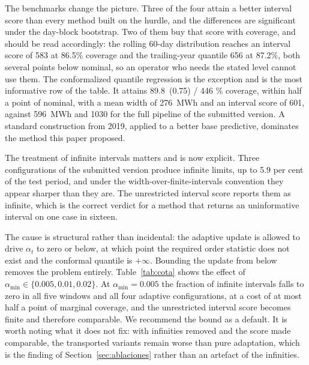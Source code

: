 \documentclass[preprint,3p,times]{elsarticle}
\providecommand{\DIFaddtex}[1]{{\protect\color{blue} \sf #1}} %
\providecommand{\DIFdeltex}[1]{{\protect\color{red} \scriptsize #1}} %
\providecommand{\DIFaddFL}[1]{\DIFadd{#1}} %
\providecommand{\DIFdelFL}[1]{\DIFdel{#1}} %
\providecommand{\DIFaddbeginFL}{} %
\providecommand{\DIFaddendFL}{} %
\providecommand{\DIFdelbeginFL}{} %
\providecommand{\DIFdelendFL}{} %
\providecommand{\DIFadd}[1]{\texorpdfstring{\DIFaddtex{#1}}{#1}} %
\providecommand{\DIFdel}[1]{\texorpdfstring{\DIFdeltex{#1}}{}} %
\begin{document}


\DIFaddFL{The benchmarks change the picture. Three of the four attain a better interval score than every method built on the hurdle, and the differences are significant under the day-block bootstrap. Two of them buy that score with coverage, and should be read accordingly: the rolling 60-day distribution reaches an interval score of 583 at 86.5\% coverage and the trailing-year quantile 656 at 87.2\%, both several points below nominal, so an operator who needs the stated level cannot use them. The conformalized quantile regression is the exception and is the most informative row of the table. It attains }\DIFaddendFL 89.8\DIFdelbeginFL \DIFdelFL{\,(0.75) / 446 }%
\DIFdelendFL \DIFaddbeginFL \DIFaddFL{\% coverage, within half a point of nominal, with a mean width of 276~MWh and an interval score of 601, against 596~MWh and 1030 for the full pipeline of the submitted version. A standard construction from 2019, applied to a better base predictive, dominates the method this paper proposed.
}

\DIFaddFL{The treatment of infinite intervals matters and is now explicit. Three configurations of the submitted version produce infinite limits, up to 5.9 per cent of the test period, and under the width-over-finite-intervals convention they appear sharper than they are. The unrestricted interval score reports them as infinite, which is the correct verdict for a method that returns an uninformative interval on one case in sixteen.
}

\DIFaddFL{The cause is structural rather than incidental: the adaptive update is allowed to drive $\alpha_t$ to zero or below, at which point the required order statistic does not exist and the conformal quantile is $+\infty$. Bounding the update from below removes the problem entirely. Table~\ref{tab:cota} shows the effect of $\alpha_{\min}\in\{0.005,0.01,0.02\}$. At $\alpha_{\min}=0.005$ the fraction of infinite intervals falls to zero in all five windows and all four adaptive configurations, at a cost of at most half a point of marginal coverage, and the unrestricted interval score becomes finite and therefore comparable. We recommend the bound as a default. It is worth noting what it does not fix: with infinities removed and the score made comparable, the transported variants remain worse than pure adaptation, which is the finding of Section~\ref{sec:ablaciones} rather than an artefact of the infinities.
}
\end{document}
